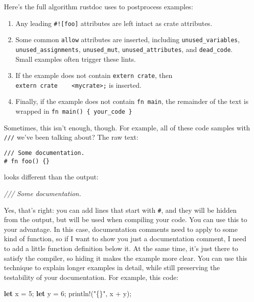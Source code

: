 \documentclass[a4paper,]{book}
\newenvironment{Shaded}{\begin{snugshade}}{\end{snugshade}}
\newcommand{\KeywordTok}[1]{\textcolor[rgb]{0.13,0.29,0.53}{\textbf{{#1}}}}
\newcommand{\DecValTok}[1]{\textcolor[rgb]{0.00,0.00,0.81}{{#1}}}
\newcommand{\StringTok}[1]{\textcolor[rgb]{0.31,0.60,0.02}{{#1}}}
\newcommand{\CommentTok}[1]{\textcolor[rgb]{0.56,0.35,0.01}{\textit{{#1}}}}
\newcommand{\OtherTok}[1]{\textcolor[rgb]{0.56,0.35,0.01}{{#1}}}
\newcommand{\NormalTok}[1]{{#1}}
\begin{document}
Here's the full algorithm rustdoc uses to postprocess examples:

\begin{enumerate}
\def\labelenumi{\arabic{enumi}.}
\itemsep1pt\parskip0pt
\item
  Any leading \texttt{\#!{[}foo{]}} attributes are left intact as crate
  attributes.
\item
  Some common \texttt{allow} attributes are inserted, including
  \texttt{unused\_variables}, \texttt{unused\_assignments},
  \texttt{unused\_mut}, \texttt{unused\_attributes}, and
  \texttt{dead\_code}. Small examples often trigger these lints.
\item
  If the example does not contain \texttt{extern\ crate}, then
  \texttt{extern\ crate\ \ \ \ \textless{}mycrate\textgreater{};} is
  inserted.
\item
  Finally, if the example does not contain \texttt{fn\ main}, the
  remainder of the text is wrapped in
  \texttt{fn\ main()\ \{\ your\_code\ \}}
\end{enumerate}

Sometimes, this isn't enough, though. For example, all of these code
samples with \texttt{///} we've been talking about? The raw text:

\begin{verbatim}
/// Some documentation.
# fn foo() {}
\end{verbatim}

looks different than the output:

\begin{Shaded}
\begin{Highlighting}[]
\CommentTok{/// Some documentation.}
\end{Highlighting}
\end{Shaded}

Yes, that's right: you can add lines that start with \texttt{\#}, and
they will be hidden from the output, but will be used when compiling
your code. You can use this to your advantage. In this case,
documentation comments need to apply to some kind of function, so if I
want to show you just a documentation comment, I need to add a little
function definition below it. At the same time, it's just there to
satisfy the compiler, so hiding it makes the example more clear. You can
use this technique to explain longer examples in detail, while still
preserving the testability of your documentation. For example, this
code:

\begin{Shaded}
\begin{Highlighting}[]
\KeywordTok{let} \NormalTok{x = }\DecValTok{5}\NormalTok{;}
\KeywordTok{let} \NormalTok{y = }\DecValTok{6}\NormalTok{;}
\OtherTok{println!}\NormalTok{(}\StringTok{"\{\}"}\NormalTok{, x + y);}
\end{Highlighting}
\end{Shaded}
\end{document}
